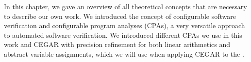 
In this chapter, we gave an overview of all theoretical concepts that are necessary to describe our own work. We introduced the concept of configurable software verification and configurable program analyses (CPAs), a very versatile approach to automated software verification. We introduced different CPAs we use in this work and CEGAR with precision refinement for both linear arithmetics and abstract variable assignments, which we will use when applying CEGAR to the \symbolicExecutionCPA.
